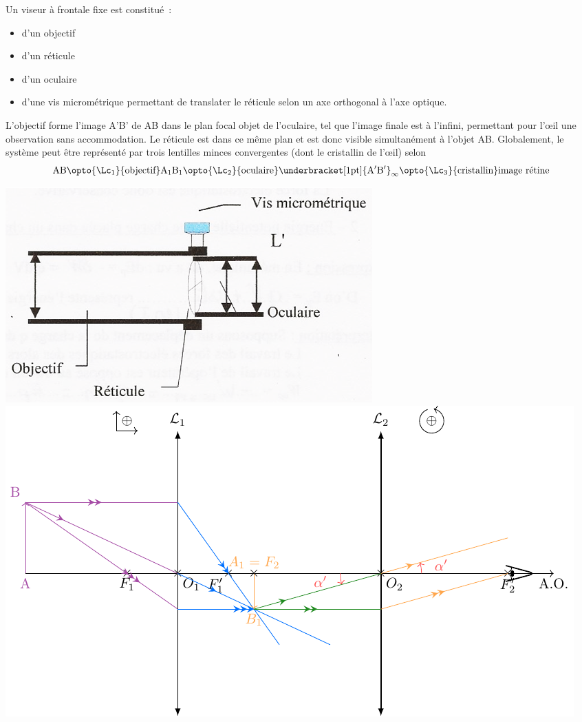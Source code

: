 \documentclass[../main/main.tex]{subfiles}
\begin{document}
{	\noindent
	\begin{minipage}[c]{.48\linewidth}
		Un viseur à frontale fixe est constitué~:
		\begin{itemize}
			\item d'un objectif
			\item d'un réticule
			\item d'un oculaire
			\item d'une vis micrométrique permettant de translater le réticule selon un
			      axe orthogonal à l'axe optique.
		\end{itemize}
		L'objectif forme l'image A'B' de AB dans le plan focal objet de l'oculaire,
		tel que l'image finale est à l'infini, permettant pour l'œil une observation
		sans accommodation. Le réticule est dans ce même plan et est donc visible
		simultanément à l'objet AB. Globalement, le système peut être représenté par
		trois lentilles minces convergentes (dont le cristallin de l'œil) selon
		\[
			\rm AB
			\opto{\Lc_1}{\text{objectif}}
			A_1B_1
			\opto{\Lc_2}{\text{oculaire}}
			\underbracket[1pt]{\rm A'B'}_{\infty}
			\opto{\Lc_3}{\text{cristallin}}
			\text{image rétine}
		\]
	\end{minipage}
	\hfill
	\begin{minipage}[c]{.48\linewidth}
		\vspace{0pt}
		\begin{center}
			\includegraphics[width=\linewidth]{dispositif}
			\includegraphics[width=\linewidth]{microscope}

\end{center}
\end{minipage}}
\end{document}
